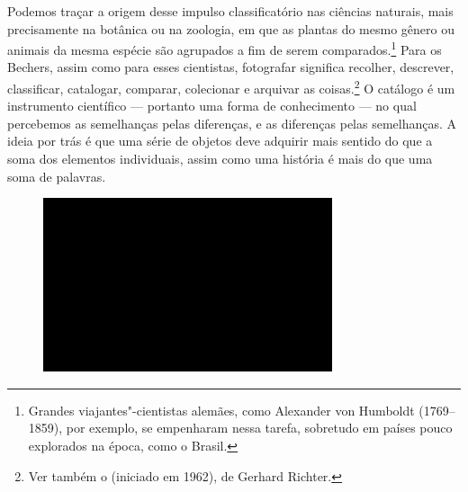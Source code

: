Podemos traçar a origem desse impulso classificatório nas ciências \label{grid}
naturais, mais precisamente na botânica ou na zoologia, em que as
plantas do mesmo gênero ou animais da mesma espécie são agrupados a fim
de serem comparados.\footnote{Grandes viajantes"-cientistas alemães, como Alexander von Humboldt (1769--1859), por exemplo, se empenharam nessa tarefa, sobretudo em países pouco explorados na época, como o Brasil.} Para os Bechers, assim como para esses cientistas,
fotografar significa recolher, descrever, classificar, catalogar,
comparar, colecionar e arquivar as coisas.\footnote{Ver também o
  {} (iniciado em 1962), de Gerhard Richter.} O catálogo é um
instrumento científico --- portanto uma forma de conhecimento --- no qual
percebemos as semelhanças pelas diferenças, e as diferenças pelas
semelhanças. A ideia por trás é que uma série de objetos deve adquirir
mais sentido do que a soma dos elementos individuais, assim como uma
história é mais do que uma soma de palavras.

\begin{figure}[!ht]

\centering
 \includegraphics[width=85mm]{./imgs/im1.jpg}
\caption{\tiny{}}

\end{figure}


